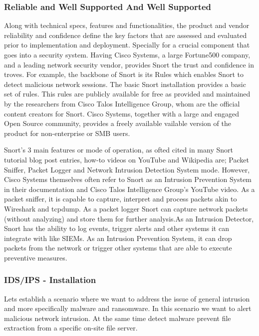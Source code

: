 \subsubsection{Reliable and Well Supported And Well Supported}

Along with technical specs, features and functionalities, the product and vendor reliability and confidence define the key factors that are assessed and evaluated prior to implementation and deployment. Specially for a crucial component that goes into a security system. Having Cisco Systems, a large Fortune500 company, and a leading network security vendor, provides Snort the trust and confidence in troves. For example, the backbone of Snort is its Rules which enables Snort to detect malicious network sessions. The basic Snort installation provides a basic set of rules. This rules are publicly available for free as provided and maintained by the researchers from Cisco Talos Intelligence Group, whom are the official content creators for Snort. Cisco Systems, together with a large and engaged Open Source community, provides a freely available vailable version of the product for non-enterprise or SMB users.

Snort's 3 main features or mode of operation, as ofted cited in many Snort tutorial blog post entries, how-to videos on YouTube and Wikipedia are; Packet Sniffer, Packet Logger and Network Intrusion Detection System mode\cite{Wikipedia2022_Snort}. However, Cisco Systems themselves often refer to Snort as an Intrusion Prevention System in their documentation\cite{Ciscco_Snort3_Configuration_Guide_v7} and Cisco Talos Intelligence Group's YouTube video\cite{TIG2020_Snort_101}. As a packet sniffer, it is capable to capture, interpret and process packets akin to Wireshark and tcpdump. As a packet logger Snort can capture network packets (without analyzing) and store them for further analysis.As an Intrusion Detector, Snort has the ability to log events, trigger alerts and other systems it can integrate with like SIEMs. As an Intrusion Prevention System, it can drop packets from the network or trigger other systems that are able to execute preventive measures.\\

\subsubsection{IDS/IPS - Installation}

Lets establish a scenario where we want to address the issue of general intrusion and more specifically malware and ransomware. In this scenario we want to alert malicious network intrusion. At the same time detect malware prevent file extraction from a specific on-site file server.

